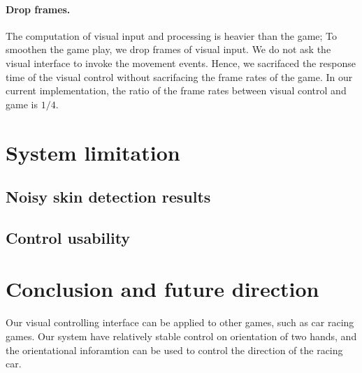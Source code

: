 \documentclass[10pt,twocolumn,letterpaper]{article}
\begin{document}
\paragraph{Drop frames.} The computation of visual input 
and processing is heavier than the game; To smoothen the game 
play, we drop frames of visual input. We do not ask 
the visual interface to invoke the movement events. 
Hence, we sacrifaced the response time of the visual control 
without sacrifacing the frame rates of the game. In our 
current implementation, the ratio of the frame rates between 
visual control and game is $1/4$.

\section{System limitation}

\subsection{Noisy skin detection results}

\subsection{Control usability}

\section{Conclusion and future direction}
Our visual controlling interface can be applied to other games, 
such as car racing games. Our system have relatively stable control on 
orientation of two hands, and the orientational inforamtion can be 
used to control the direction of the racing car.

{\small


}
\end{document}
